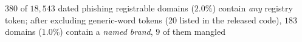 $380$ of $18,543$ dated phishing registrable domains ($2.0\%$) contain \emph{any} registry token; after excluding generic-word tokens (20 listed in the released code), $183$ domains ($1.0\%$) contain a \emph{named brand}, $9$ of them mangled%
